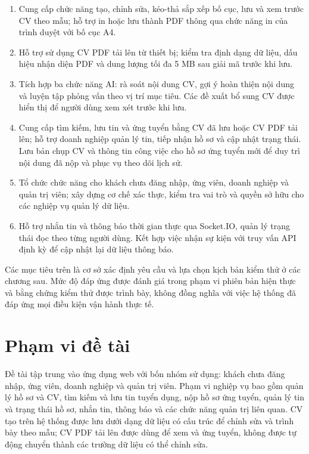 \begin{enumerate}
    \item Cung cấp chức năng tạo, chỉnh sửa, kéo-thả sắp xếp bố cục, lưu và xem trước CV theo mẫu; hỗ trợ in hoặc lưu thành PDF thông qua chức năng in của trình duyệt với bố cục A4.
    \item Hỗ trợ sử dụng CV PDF tải lên từ thiết bị; kiểm tra định dạng dữ liệu, dấu hiệu nhận diện PDF và dung lượng tối đa 5 MB sau giải mã trước khi lưu.
    \item Tích hợp ba chức năng AI: rà soát nội dung CV, gợi ý hoàn thiện nội dung và luyện tập phỏng vấn theo vị trí mục tiêu. Các đề xuất bổ sung CV được hiển thị để người dùng xem xét trước khi lưu.
    \item Cung cấp tìm kiếm, lưu tin và ứng tuyển bằng CV đã lưu hoặc CV PDF tải lên; hỗ trợ doanh nghiệp quản lý tin, tiếp nhận hồ sơ và cập nhật trạng thái. Lưu bản chụp CV và thông tin công việc cho hồ sơ ứng tuyển mới để duy trì nội dung đã nộp và phục vụ theo dõi lịch sử.
    \item Tổ chức chức năng cho khách chưa đăng nhập, ứng viên, doanh nghiệp và quản trị viên; xây dựng cơ chế xác thực, kiểm tra vai trò và quyền sở hữu cho các nghiệp vụ quản lý dữ liệu.
    \item Hỗ trợ nhắn tin và thông báo thời gian thực qua Socket.IO, quản lý trạng thái đọc theo từng người dùng. Kết hợp việc nhận sự kiện với truy vấn API định kỳ để cập nhật lại dữ liệu thông báo.
\end{enumerate}

Các mục tiêu trên là cơ sở xác định yêu cầu và lựa chọn kịch bản kiểm thử ở các chương sau. Mức độ đáp ứng được đánh giá trong phạm vi phiên bản hiện thực và bằng chứng kiểm thử được trình bày, không đồng nghĩa với việc hệ thống đã đáp ứng mọi điều kiện vận hành thực tế.

\section{Phạm vi đề tài}

Đề tài tập trung vào ứng dụng web với bốn nhóm sử dụng: khách chưa đăng nhập, ứng viên, doanh nghiệp và quản trị viên. Phạm vi nghiệp vụ bao gồm quản lý hồ sơ và CV, tìm kiếm và lưu tin tuyển dụng, nộp hồ sơ ứng tuyển, quản lý tin và trạng thái hồ sơ, nhắn tin, thông báo và các chức năng quản trị liên quan. CV tạo trên hệ thống được lưu dưới dạng dữ liệu có cấu trúc để chỉnh sửa và trình bày theo mẫu; CV PDF tải lên được dùng để xem và ứng tuyển, không được tự động chuyển thành các trường dữ liệu có thể chỉnh sửa.

